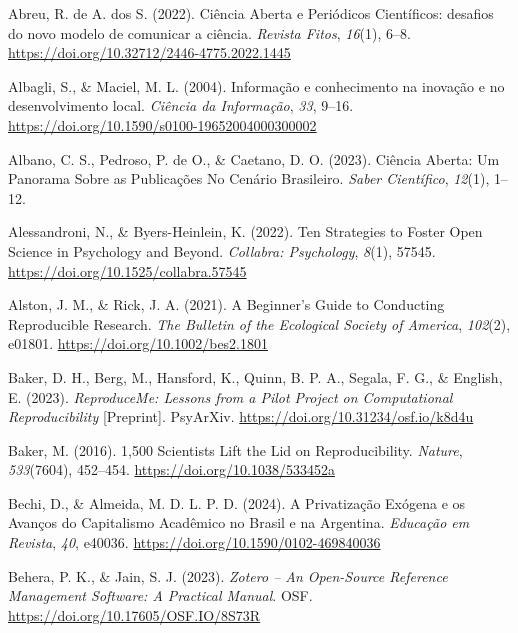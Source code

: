 \documentclass[
  a4paper,
]{book}
\newlength{\cslhangindent}
\newenvironment{CSLReferences}[2] %
 {\begin{list}{}{%
  \setlength{\itemindent}{0pt}
  \setlength{\leftmargin}{0pt}
  \setlength{\parsep}{0pt}
  \ifodd #1
   \setlength{\leftmargin}{\cslhangindent}
   \setlength{\itemindent}{-1\cslhangindent}
  \fi
  \setlength{\itemsep}{#2\baselineskip}}}
 {\end{list}}
\begin{document}
\label{refs}
\begin{CSLReferences}{1}{0}
Abreu, R. de A. dos S. (2022). Ciência Aberta e Periódicos Científicos:
desafios do novo modelo de comunicar a ciência. \emph{Revista Fitos},
\emph{16}(1), 6--8. \url{https://doi.org/10.32712/2446-4775.2022.1445}

Albagli, S., \& Maciel, M. L. (2004). Informação e conhecimento na
inovação e no desenvolvimento local. \emph{Ciência da Informação},
\emph{33}, 9--16. \url{https://doi.org/10.1590/s0100-19652004000300002}

Albano, C. S., Pedroso, P. de O., \& Caetano, D. O. (2023). Ci{ê}ncia
{Aberta}: {Um Panorama} Sobre as {Publica{ç}{õ}es} No {Cen{á}rio
Brasileiro}. \emph{Saber Cient{í}fico}, \emph{12}(1), 1--12.

Alessandroni, N., \& Byers-Heinlein, K. (2022). Ten Strategies to Foster
Open Science in Psychology and Beyond. \emph{Collabra: Psychology},
\emph{8}(1), 57545. \url{https://doi.org/10.1525/collabra.57545}

Alston, J. M., \& Rick, J. A. (2021). A Beginner's Guide to Conducting
Reproducible Research. \emph{The Bulletin of the Ecological Society of
America}, \emph{102}(2), e01801. \url{https://doi.org/10.1002/bes2.1801}

Baker, D. H., Berg, M., Hansford, K., Quinn, B. P. A., Segala, F. G., \&
English, E. (2023). \emph{{ReproduceMe}: Lessons from a Pilot Project on
Computational Reproducibility} {[}Preprint{]}. PsyArXiv.
\url{https://doi.org/10.31234/osf.io/k8d4u}

Baker, M. (2016). 1,500 Scientists Lift the Lid on Reproducibility.
\emph{Nature}, \emph{533}(7604), 452--454.
\url{https://doi.org/10.1038/533452a}

Bechi, D., \& Almeida, M. D. L. P. D. (2024). A Privatização Exógena e
os Avanços do Capitalismo Acadêmico no Brasil e na Argentina.
\emph{Educação em Revista}, \emph{40}, e40036.
\url{https://doi.org/10.1590/0102-469840036}

Behera, P. K., \& Jain, S. J. (2023). \emph{Zotero -- An Open-Source
Reference Management Software: A Practical Manual}. OSF.
\url{https://doi.org/10.17605/OSF.IO/8S73R}


\end{CSLReferences}
\end{document}

